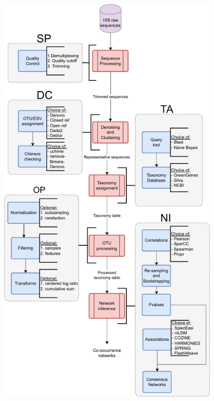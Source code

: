 \documentclass[letterpaper,12pt]{article}
\providecommand{\DIFaddbeginFL}{} %
\providecommand{\DIFaddendFL}{} %
\providecommand{\DIFdelbeginFL}{} %
\providecommand{\DIFdelendFL}{} %
\newcommand{\DIFscaledelfig}{0.5}
\newlength{\DIFdelgraphicswidth} %
\newlength{\DIFdelgraphicsheight} %
\newcommand{\DIFaddincludegraphics}[2][]{{\color{blue}\fbox{\DIFOincludegraphics[#1]{#2}}}} %
\newcommand{\DIFdelincludegraphics}[2][]{%
\sbox{\DIFdelgraphicsbox}{\DIFOincludegraphics[#1]{#2}}%
\settoboxwidth{\DIFdelgraphicswidth}{\DIFdelgraphicsbox} %
\settoboxtotalheight{\DIFdelgraphicsheight}{\DIFdelgraphicsbox} %
\scalebox{\DIFscaledelfig}{%
\parbox[b]{\DIFdelgraphicswidth}{\usebox{\DIFdelgraphicsbox}\\[-\baselineskip] \rule{\DIFdelgraphicswidth}{0em}}\llap{\resizebox{\DIFdelgraphicswidth}{\DIFdelgraphicsheight}{%
\setlength{\unitlength}{\DIFdelgraphicswidth}%
\begin{picture}(1,1)%
\thicklines\linethickness{2pt} %
{\color[rgb]{1,0,0}\put(0,0){\framebox(1,1){}}}%
{\color[rgb]{1,0,0}\put(0,0){\line( 1,1){1}}}%
{\color[rgb]{1,0,0}\put(0,1){\line(1,-1){1}}}%
\end{picture}%
}\hspace*{3pt}}} %
} %
\DeclareRobustCommand{\DIFaddbeginFL}{\DIFOaddbeginFL \let\includegraphics\DIFaddincludegraphics} %
\DeclareRobustCommand{\DIFaddendFL}{\DIFOaddendFL \let\includegraphics\DIFOincludegraphics} %
\DeclareRobustCommand{\DIFdelbeginFL}{\DIFOdelbeginFL \let\includegraphics\DIFdelincludegraphics} %
\DeclareRobustCommand{\DIFdelendFL}{\DIFOaddendFL \let\includegraphics\DIFOincludegraphics} %
\begin{document}
  \FloatBarrier
  \newpage
  \begin{figure}[H]
    \DIFaddendFL \centering
    \DIFdelbeginFL %
\DIFdelendFL \DIFaddbeginFL \includegraphics[width=0.74\linewidth]{figure1.pdf}
  \end{figure}
\end{document}
